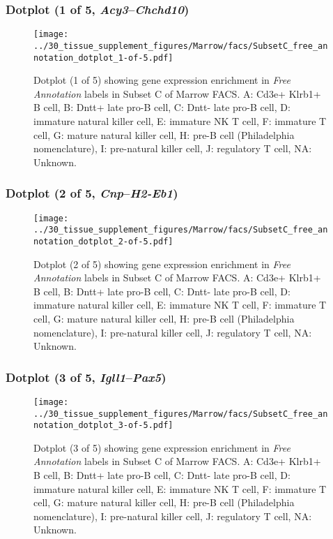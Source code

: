 \clearpage

\subsubsection{Dotplot (1 of 5, \emph{Acy3}--\emph{Chchd10})}
\begin{figure}[h]
\centering
\texttt{[image: ../30\_tissue\_supplement\_figures/Marrow/facs/SubsetC\_free\_annotation\_dotplot\_1-of-5.pdf]}

\caption{ Dotplot (1 of 5)  showing gene expression enrichment in \emph{Free Annotation} labels in Subset C of Marrow FACS. A: Cd3e+ Klrb1+ B cell, B: Dntt+ late pro-B cell, C: Dntt- late pro-B cell, D: immature natural killer cell, E: immature NK T cell, F: immature T cell, G: mature natural killer cell, H: pre-B cell (Philadelphia nomenclature), I: pre-natural killer cell, J: regulatory T cell, NA: Unknown.}
\end{figure}


\clearpage

\subsubsection{Dotplot (2 of 5, \emph{Cnp}--\emph{H2-Eb1})}
\begin{figure}[h]
\centering
\texttt{[image: ../30\_tissue\_supplement\_figures/Marrow/facs/SubsetC\_free\_annotation\_dotplot\_2-of-5.pdf]}

\caption{ Dotplot (2 of 5)  showing gene expression enrichment in \emph{Free Annotation} labels in Subset C of Marrow FACS. A: Cd3e+ Klrb1+ B cell, B: Dntt+ late pro-B cell, C: Dntt- late pro-B cell, D: immature natural killer cell, E: immature NK T cell, F: immature T cell, G: mature natural killer cell, H: pre-B cell (Philadelphia nomenclature), I: pre-natural killer cell, J: regulatory T cell, NA: Unknown.}
\end{figure}


\clearpage

\subsubsection{Dotplot (3 of 5, \emph{Igll1}--\emph{Pax5})}
\begin{figure}[h]
\centering
\texttt{[image: ../30\_tissue\_supplement\_figures/Marrow/facs/SubsetC\_free\_annotation\_dotplot\_3-of-5.pdf]}

\caption{ Dotplot (3 of 5)  showing gene expression enrichment in \emph{Free Annotation} labels in Subset C of Marrow FACS. A: Cd3e+ Klrb1+ B cell, B: Dntt+ late pro-B cell, C: Dntt- late pro-B cell, D: immature natural killer cell, E: immature NK T cell, F: immature T cell, G: mature natural killer cell, H: pre-B cell (Philadelphia nomenclature), I: pre-natural killer cell, J: regulatory T cell, NA: Unknown.}
\end{figure}


